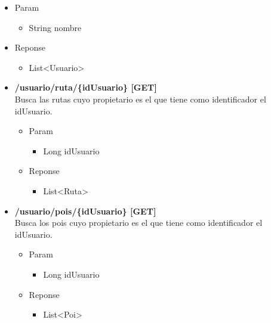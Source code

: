 \begin{itemize}
\begin{itemize}
\begin{itemize}
\item Param
\begin{itemize}
\item String nombre
\end{itemize}

\item Reponse
\begin{itemize}
\item List<Usuario> 
\end{itemize}
\end{itemize}
\end{itemize}


\begin{itemize}
\item  \textbf{/usuario/ruta/\{idUsuario\} [GET]}\\
Busca las rutas cuyo propietario es el que tiene como identificador el idUsuario.
\begin{itemize}
\item Param
\begin{itemize}
\item  Long idUsuario
\end{itemize}
\item Reponse
\begin{itemize}
\item List<Ruta>
\end{itemize}
\end{itemize}
\end{itemize}
 


 \begin{itemize}
\item  \textbf{/usuario/pois/\{idUsuario\} [GET]}\\
Busca los pois cuyo propietario es el que tiene como identificador el idUsuario.
\begin{itemize}
\item Param
\begin{itemize}
\item Long idUsuario
\end{itemize}
\item Reponse
\begin{itemize}
\item List<Poi>
\end{itemize}
\end{itemize}
\end{itemize}



\end{itemize}
